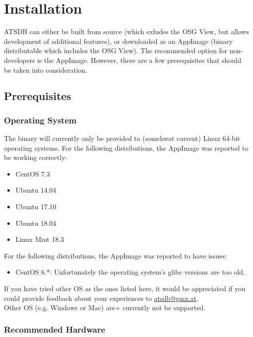 \chapter{Installation}
\label{sec:installation}

ATSDB can either be built from source (which exludes the OSG View, but allows development of additional features), or downloaded as an AppImage (binary distributable which includes the OSG View). The recommended option for non-developers is the AppImage. However, there are a few prerequisites that should be taken into consideration.

\section{Prerequisites}

\subsection{Operating System}

The binary will currently only be provided to (somehwat current) Linux 64-bit operating systems. For the following distributions, the AppImage was reported to be working correctly:

\begin{itemize}  
\item CentOS 7.3
\item Ubuntu 14.04
\item Ubuntu 17.10
\item Ubuntu 18.04
\item Linux Mint 18.3
\end{itemize}

For the following distributions, the AppImage was reported to have issues:

\begin{itemize}  
\item CentOS 6.*: Unfortunately the operating system's glibc versions are too old.
\end{itemize}

If you have tried other OS as the ones listed here, it would be appreciated if you could provide feedback about your experiences to \href{mailto:atsdb@gmx.at}{atsdb@gmx.at}.\\

Other OS (e.g. Windows or Mac) are+ currently not be supported.

\subsection{Recommended Hardware}

